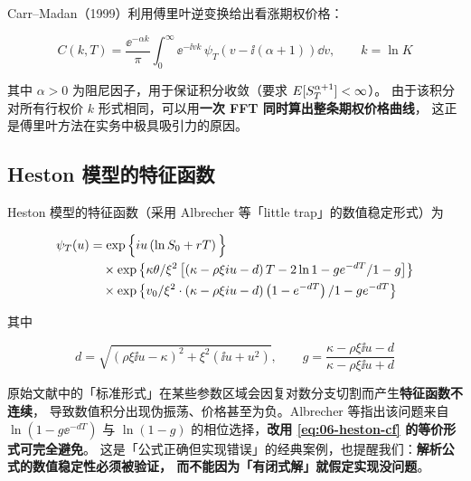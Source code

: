 Carr--Madan（1999）利用傅里叶逆变换给出看涨期权价格：

\begin{equation}
  C(k,T) = \frac{\ee^{-\alpha k}}{\pi}\int_0^{\infty}\ee^{-\ii vk}\,
           \psi_T\!\left(v-\ii(\alpha+1)\right)\dd v,
  \qquad k = \ln K
  \label{eq:06-carr-madan}
\end{equation}

其中 $\alpha>0$ 为阻尼因子，用于保证积分收敛（要求 $E[S_T^{\alpha+1}]<\infty$）。
由于该积分对所有行权价 $k$ 形式相同，可以用\textbf{一次 FFT 同时算出整条期权价格曲线}，
这正是傅里叶方法在实务中极具吸引力的原因。

\subsection{Heston 模型的特征函数}

Heston 模型的特征函数（采用 Albrecher 等「little trap」的数值稳定形式）为

\begin{align}
  \psi_T(u) &= \exp\Big\{i u\left(\ln S_0+rT\right)\Big\}\notag\\
  &\quad\times\exp\left\{\kappa\theta/\xi^{2}
     \left[\left(\kappa-\rho\xi i u-d\right)T-2\ln1-ge^{-dT}/1-g\right]\right\}\notag\\
  &\quad\times\exp\left\{v_0/\xi^{2}\cdot
     \left(\kappa-\rho\xi i u-d\right)\left(1-e^{-dT}\right)/1-ge^{-dT}\right\}
  \label{eq:06-heston-cf}
\end{align}

其中

\begin{equation}
  d = \sqrt{\left(\rho\xi\ii u-\kappa\right)^{2}+\xi^{2}\left(\ii u+u^{2}\right)},
  \qquad
  g = \frac{\kappa-\rho\xi\ii u-d}{\kappa-\rho\xi\ii u+d}
  \label{eq:06-heston-dg}
\end{equation}

\begin{warningbox}
原始文献中的「标准形式」在某些参数区域会因复对数分支切割而产生\textbf{特征函数不连续}，
导致数值积分出现伪振荡、价格甚至为负。Albrecher 等指出该问题来自
$\ln(1-g\ee^{-dT})$ 与 $\ln(1-g)$ 的相位选择，\textbf{改用 \cref{eq:06-heston-cf} 的等价形式可完全避免}。
这是「公式正确但实现错误」的经典案例，也提醒我们：\textbf{解析公式的数值稳定性必须被验证，
而不能因为「有闭式解」就假定实现没问题}。
\end{warningbox}

